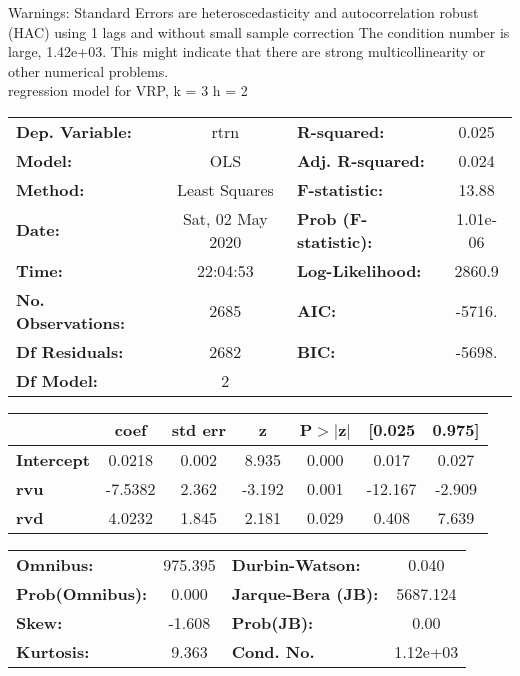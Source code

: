 Warnings: \newline
 [1] Standard Errors are heteroscedasticity and autocorrelation robust (HAC) using 1 lags and without small sample correction \newline
 [2] The condition number is large, 1.42e+03. This might indicate that there are \newline
 strong multicollinearity or other numerical problems.\\ 

regression model for VRP, k = 3 h = 2\begin{center}
\begin{tabular}{lclc}
\toprule
\textbf{Dep. Variable:}    &       rtrn       & \textbf{  R-squared:         } &     0.025   \\
\textbf{Model:}            &       OLS        & \textbf{  Adj. R-squared:    } &     0.024   \\
\textbf{Method:}           &  Least Squares   & \textbf{  F-statistic:       } &     13.88   \\
\textbf{Date:}             & Sat, 02 May 2020 & \textbf{  Prob (F-statistic):} &  1.01e-06   \\
\textbf{Time:}             &     22:04:53     & \textbf{  Log-Likelihood:    } &    2860.9   \\
\textbf{No. Observations:} &        2685      & \textbf{  AIC:               } &    -5716.   \\
\textbf{Df Residuals:}     &        2682      & \textbf{  BIC:               } &    -5698.   \\
\textbf{Df Model:}         &           2      & \textbf{                     } &             \\
\bottomrule
\end{tabular}
\begin{tabular}{lcccccc}
                   & \textbf{coef} & \textbf{std err} & \textbf{z} & \textbf{P$> |$z$|$} & \textbf{[0.025} & \textbf{0.975]}  \\
\midrule
\textbf{Intercept} &       0.0218  &        0.002     &     8.935  &         0.000        &        0.017    &        0.027     \\
\textbf{rvu}       &      -7.5382  &        2.362     &    -3.192  &         0.001        &      -12.167    &       -2.909     \\
\textbf{rvd}       &       4.0232  &        1.845     &     2.181  &         0.029        &        0.408    &        7.639     \\
\bottomrule
\end{tabular}
\begin{tabular}{lclc}
\textbf{Omnibus:}       & 975.395 & \textbf{  Durbin-Watson:     } &    0.040  \\
\textbf{Prob(Omnibus):} &   0.000 & \textbf{  Jarque-Bera (JB):  } & 5687.124  \\
\textbf{Skew:}          &  -1.608 & \textbf{  Prob(JB):          } &     0.00  \\
\textbf{Kurtosis:}      &   9.363 & \textbf{  Cond. No.          } & 1.12e+03  \\
\bottomrule
\end{tabular}
\end{center}

